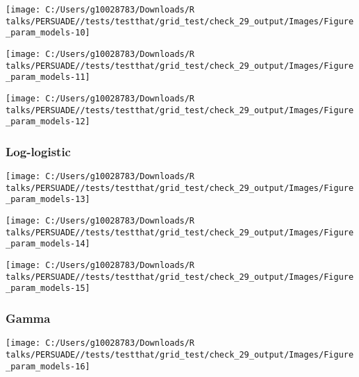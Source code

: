 \documentclass[
]{article}
\begin{document}
\begin{flushleft}\texttt{[image: C:/Users/g10028783/Downloads/R talks/PERSUADE//tests/testthat/grid\_test/check\_29\_output/Images/Figure\_param\_models-10]} \end{flushleft}

\begin{flushleft}\texttt{[image: C:/Users/g10028783/Downloads/R talks/PERSUADE//tests/testthat/grid\_test/check\_29\_output/Images/Figure\_param\_models-11]} \end{flushleft}

\begin{flushleft}\texttt{[image: C:/Users/g10028783/Downloads/R talks/PERSUADE//tests/testthat/grid\_test/check\_29\_output/Images/Figure\_param\_models-12]} \end{flushleft}

\clearpage

\subsubsection{Log-logistic}\label{log-logistic}

\begin{flushleft}\texttt{[image: C:/Users/g10028783/Downloads/R talks/PERSUADE//tests/testthat/grid\_test/check\_29\_output/Images/Figure\_param\_models-13]} \end{flushleft}

\begin{flushleft}\texttt{[image: C:/Users/g10028783/Downloads/R talks/PERSUADE//tests/testthat/grid\_test/check\_29\_output/Images/Figure\_param\_models-14]} \end{flushleft}

\begin{flushleft}\texttt{[image: C:/Users/g10028783/Downloads/R talks/PERSUADE//tests/testthat/grid\_test/check\_29\_output/Images/Figure\_param\_models-15]} \end{flushleft}

\clearpage

\subsubsection{Gamma}\label{gamma}

\begin{flushleft}\texttt{[image: C:/Users/g10028783/Downloads/R talks/PERSUADE//tests/testthat/grid\_test/check\_29\_output/Images/Figure\_param\_models-16]} \end{flushleft}
\end{document}

